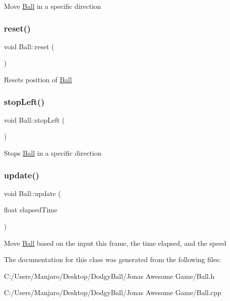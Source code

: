 Move \mbox{\hyperlink{class_ball}{Ball}} in a specific direction 

\mbox{\label{class_ball_ad51eef8304541159f12dee1f1674ec90}} 
\subsubsection{\texorpdfstring{reset()}{reset()}}
{\footnotesize\ttfamily void Ball\+::reset (\begin{DoxyParamCaption}{ }\end{DoxyParamCaption})}



Resets position of \mbox{\hyperlink{class_ball}{Ball}} 

\mbox{\label{class_ball_ab19bf068b3ea5b9468479478880f0831}} 
\subsubsection{\texorpdfstring{stopLeft()}{stopLeft()}}
{\footnotesize\ttfamily void Ball\+::stop\+Left (\begin{DoxyParamCaption}{ }\end{DoxyParamCaption})}



Stops \mbox{\hyperlink{class_ball}{Ball}} in a specific direction 

\mbox{\label{class_ball_abedf04351568d8ae5859c15726eee558}} 
\subsubsection{\texorpdfstring{update()}{update()}}
{\footnotesize\ttfamily void Ball\+::update (\begin{DoxyParamCaption}\item[{float}]{elapsed\+Time }\end{DoxyParamCaption})}



Move \mbox{\hyperlink{class_ball}{Ball}} based on the input this frame, the time elapsed, and the speed 



The documentation for this class was generated from the following files\+:\begin{DoxyCompactItemize}
\item 
C\+:/\+Users/\+Manjaro/\+Desktop/\+Dodgy\+Ball/\+Jonas Awesome Game/Ball.\+h\item 
C\+:/\+Users/\+Manjaro/\+Desktop/\+Dodgy\+Ball/\+Jonas Awesome Game/Ball.\+cpp\end{DoxyCompactItemize}

